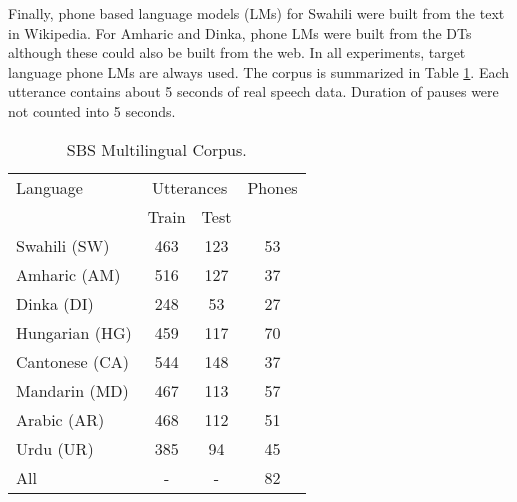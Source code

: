 \documentclass[a4paper]{article}
\begin{document}


Finally, phone based language models (LMs) for Swahili were built from the text in Wikipedia. For Amharic and Dinka, phone LMs were built from the DTs although these could also be built from the web. In all experiments, target language phone LMs are always used. The corpus is summarized in Table \ref{Tab:SBS Corpus}. Each utterance contains about 5 seconds of real speech data. Duration of pauses were not counted into 5 seconds.

\begin{table}
\begin{center}
\caption{SBS Multilingual Corpus.}
\label{Tab:SBS Corpus}
\begin{tabular}{l|c c| c}
   \hline
Language &  \multicolumn{2}{c|}{Utterances}  & Phones \\ 
                 &  Train & Test &  \\ \hline
Swahili (SW)     & 463 & 123 & 53 \\
Amharic (AM)     & 516 & 127 & 37 \\
Dinka   (DI)     & 248 &  53 & 27 \\ 
Hungarian (HG)    & 459 & 117 & 70 \\ 
Cantonese (CA)  & 544 & 148 &  37 \\ 
Mandarin (MD) & 467 & 113 &  57 \\ 
Arabic (AR) & 468 & 112 &  51 \\ 
Urdu (UR) & 385 & 94 &  45 \\ \hline
All & - & - & 82 \\ \hline
\end{tabular}
\vspace{-5mm}
\end{center}
\end{table}
\end{document}
